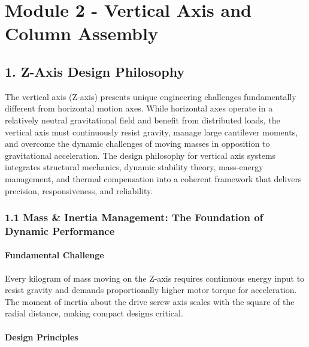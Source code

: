 \documentclass[
]{article}
\author{}
\date{}
\begin{document}
\section{Module 2 - Vertical Axis and Column
Assembly}\label{module-2---vertical-axis-and-column-assembly}

\subsection{1. Z-Axis Design Philosophy}\label{z-axis-design-philosophy}

The vertical axis (Z-axis) presents unique engineering challenges
fundamentally different from horizontal motion axes. While horizontal
axes operate in a relatively neutral gravitational field and benefit
from distributed loads, the vertical axis must continuously resist
gravity, manage large cantilever moments, and overcome the dynamic
challenges of moving masses in opposition to gravitational acceleration.
The design philosophy for vertical axis systems integrates structural
mechanics, dynamic stability theory, mass-energy management, and thermal
compensation into a coherent framework that delivers precision,
responsiveness, and reliability.

\subsubsection{1.1 Mass \& Inertia Management: The Foundation of Dynamic
Performance}\label{mass-inertia-management-the-foundation-of-dynamic-performance}

\paragraph{Fundamental Challenge}\label{fundamental-challenge}

Every kilogram of mass moving on the Z-axis requires continuous energy
input to resist gravity and demands proportionally higher motor torque
for acceleration. The moment of inertia about the drive screw axis
scales with the square of the radial distance, making compact designs
critical.

\paragraph{Design Principles}\label{design-principles}
\end{document}

